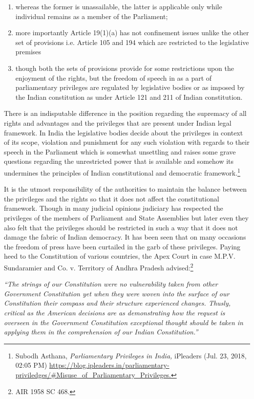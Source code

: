 \begin{multicols}{2}
\begin{enumerate}[label=$\bullet$]
\item  whereas the former is unassailable, the latter is applicable only while individual
remains as a member of the Parliament;

\item more importantly Article 19(1)(a) has not confinement issues unlike the other set of
provisions i.e. Article 105 and 194 which are restricted to the legislative premises

\item though both the sets of provisions provide for some restrictions upon the enjoyment
of the rights, but the freedom of speech in as a part of parliamentary privileges are
regulated by legislative bodies or as imposed by the Indian constitution as under
Article 121 and 211 of Indian constitution.
\end{enumerate}


\noi
There is an indisputable difference in the position regarding the supremacy of all rights and
advantages and the privileges that are present under Indian legal framework. In India the
legislative bodies decide about the privileges in context of its scope, violation and
punishment for any such violation with regards to their speech in the Parliament which is
somewhat unsettling and raises some grave questions regarding the unrestricted power that is
available and somehow its undermines the principles of Indian constitutional and democratic
framework.\footnote{Subodh Asthana, \textit{Parliamentary Privileges in India,} iPleaders (Jul. 23, 2018, 02:05 PM)
 \url{https://blog.ipleaders.in/parliamentary-priviledges/#Misuse_of_Parliamentary_Privileges.}}

\noi
It is the utmost responsibility of the authorities to maintain the balance between the privileges
and the rights so that it does not affect the constitutional framework. Though in many judicial
opinions judiciary has respected the privileges of the members of Parliament and State
Assemblies but later even they also felt that the privileges should be restricted in such a way
that it does not damage the fabric of Indian democracy. It has been seen that on many
occasions the freedom of press have been curtailed in the garb of these privileges. Paying
heed to the Constitution of various countries, the Apex Court in case M.P.V. Sundaramier
and Co. v. Territory of Andhra Pradesh advised:\footnote{AIR 1958 SC 468.}

\noi
\begin{quoting}
\textit{“The strings of our Constitution were no vulnerability taken from other Government
Constitution yet when they were woven into the surface of our Constitution their
compass and their structure experienced changes. Thusly, critical as the American
decisions are as demonstrating how the request is overseen in the Government
Constitution exceptional thought should be taken in applying them in the
comprehension of our Indian Constitution.”}
\end{quoting}


\end{multicols}
